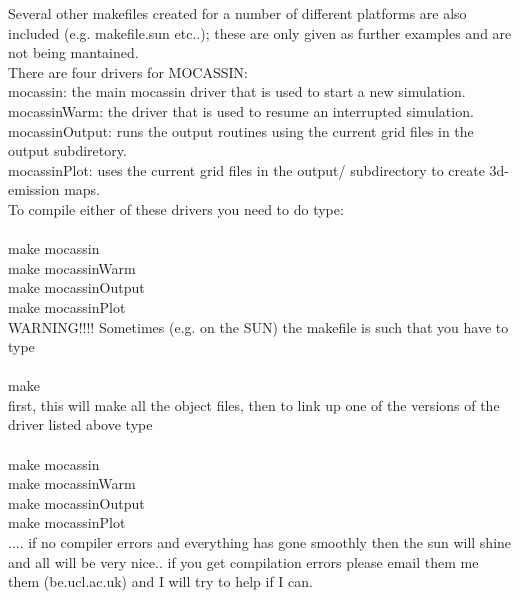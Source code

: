 \documentclass[11pt]{article}
\begin{document}
   Several other makefiles created for a number of different platforms are also included
   (e.g. makefile.sun etc..); these are only given as further examples and are not 
   being mantained.\\

   There are four drivers for MOCASSIN: \\
\indent    mocassin: the main mocassin driver that is used to start a new simulation.\\
\indent    mocassinWarm: the driver that is used to resume an interrupted simulation.\\
\indent    mocassinOutput: runs the output routines using the current grid files in the output subdiretory.\\
\indent    mocassinPlot: uses the current grid files in the output/ subdirectory to create 3d-emission maps. \\

   To compile either of these drivers you need to do type:\\
\\
\indent     make mocassin\\
\indent     make mocassinWarm\\
\indent     make mocassinOutput\\
\indent     make mocassinPlot  \\

   WARNING!!!! Sometimes (e.g. on the SUN) the makefile is such that you have to type \\
\\
\indent     make \\

\noindent   first, this will make all the object files, then to link up one of the 
   versions of the driver listed above type\\
\\
\indent     make mocassin \\
\indent     make mocassinWarm\\
\indent     make mocassinOutput\\ 
\indent     make mocassinPlot\\

\noindent   .... if no compiler errors and everything has gone smoothly then the sun will shine and 
   all will be very nice.. if you get compilation errors please email them me them 
   (be\@star.ucl.ac.uk) and I will try to help if I can.\\
\end{document}
